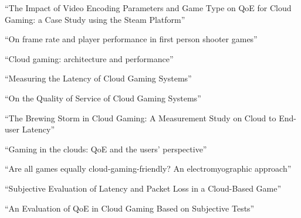 ``The Impact of Video Encoding Parameters and Game Type on QoE for Cloud Gaming: a Case Study using the Steam Platform'' \cite{slivarimpact}

``On frame rate and player performance in first person shooter games'' \cite{claypool2007}



``Cloud gaming: architecture and performance'' \cite{6574660}

``Measuring the Latency of Cloud Gaming Systems'' \cite{Chen:2011:MLC:2072298.2071991}

``On the Quality of Service of Cloud Gaming Systems'' \cite{6670099}

``The Brewing Storm in Cloud Gaming: A Measurement Study on Cloud to End-user Latency'' \cite{Choy:2012:BSC:2501560.2501563}


``Gaming in the clouds: QoE and the users’ perspective'' \cite{Jarschel20132883}

``Are all games equally cloud-gaming-friendly? An electromyographic approach'' \cite{6404025}

``Subjective Evaluation of Latency and Packet Loss in a Cloud-Based Game'' \cite{6614351}

``An Evaluation of {QoE} in Cloud Gaming Based on Subjective Tests'' \cite{5976180}






